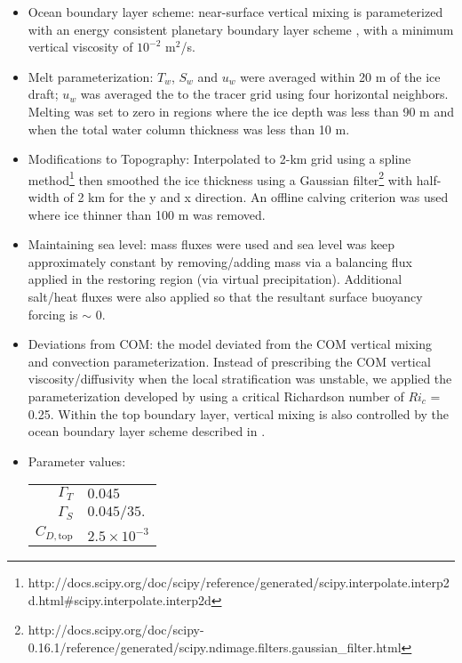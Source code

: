 \documentclass[11pt]{article} %
\begin{document}
\begin{itemize}
\item Ocean boundary layer scheme: near-surface vertical mixing is parameterized with an energy consistent planetary boundary layer scheme \citep{Reichl2018}, with a minimum vertical viscosity of $10^{-2}$ m$^2$/s.

\item Melt parameterization: $T_w$, $S_w$ and $u_w$ were averaged within 20 m of the ice draft; $u_w$ was averaged the to the tracer grid using four horizontal neighbors. Melting was set to zero in regions where the ice depth was less than 90 m and when the total water column thickness was less than 10 m.

\item Modifications to Topography: Interpolated to 2-km grid using a spline method\footnote{http://docs.scipy.org/doc/scipy/reference/generated/scipy.interpolate.interp2d.html\#scipy.interpolate.interp2d} then smoothed the ice thickness using a Gaussian filter\footnote{http://docs.scipy.org/doc/scipy-0.16.1/reference/generated/scipy.ndimage.filters.gaussian\_filter.html} with half-width of 2 km for the y and x direction. An offline calving criterion was used where ice thinner than 100 m was removed. 

\item Maintaining sea level: mass fluxes were used and sea level was keep approximately constant by removing/adding mass via a balancing flux applied in the restoring region (via virtual precipitation). Additional salt/heat fluxes were also applied so that the resultant surface buoyancy forcing is $\sim$ 0.
  
\item Deviations from COM: the model deviated from the COM vertical mixing and convection parameterization. Instead of prescribing the COM vertical viscosity/diffusivity when the local stratification was unstable, we applied the parameterization developed by \cite{Jackson2008} using a critical Richardson number of $Ri_c$ = 0.25. Within the top boundary layer, vertical mixing is also controlled by the ocean boundary layer scheme described in \cite{Reichl2018}.

\item Parameter values:

\begin{tabular}{rl}
$\Gamma_T$ & $0.045$ \\
$\Gamma_S$ & $0.045/35.$ \\
$C_{D,\textrm{top}}$ & $2.5 \times 10^{-3}$
\end{tabular}
\end{itemize}
\end{document}
